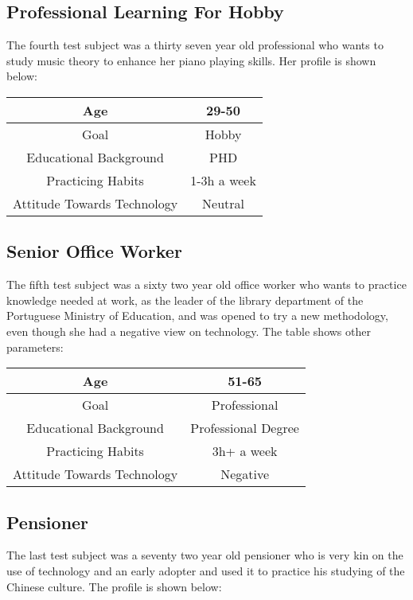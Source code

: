 \subsection{Professional Learning For Hobby}
The fourth test subject was a thirty seven year old professional who wants to
study music theory to enhance her piano playing skills. Her profile is shown
below:

\begin{center}
	\begin{tabular}{ | c | c | }
	\hline
		Age & 29-50 \\
	\hline
		Goal & Hobby \\
	\hline
		Educational Background & PHD \\
	\hline
		Practicing Habits & 1-3h a week \\
	\hline
		Attitude Towards Technology & Neutral \\
	\hline

	\end{tabular}
\end{center}


\subsection{Senior Office Worker}
The fifth test subject was a sixty two year old office worker who wants 
to practice knowledge needed at work, as the leader of the library department
of the Portuguese Ministry of Education, 
and was opened to try a new 
methodology, even though she had 
a negative view on technology. The table shows other parameters:

\begin{center}
	\begin{tabular}{ | c | c | }
	\hline
		Age & 51-65 \\
	\hline
		Goal & Professional \\
	\hline
		Educational Background & Professional Degree \\
	\hline
		Practicing Habits & 3h+ a week \\
	\hline
		Attitude Towards Technology & Negative \\
	\hline

	\end{tabular}
\end{center}

\subsection{Pensioner}
The last test subject was a seventy two year old pensioner who is very kin on
the use of technology and an early adopter and used it to practice his 
studying of the Chinese culture. The profile is shown below:


